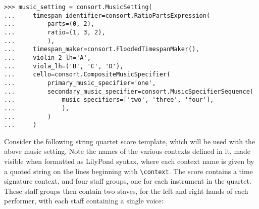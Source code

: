 \begin{abjadbookoutput}
\begin{singlespacing}
\vspace{-0.5\baselineskip}
\begin{lstlisting}
>>> music_setting = consort.MusicSetting(
...     timespan_identifier=consort.RatioPartsExpression(
...         parts=(0, 2),
...         ratio=(1, 3, 2),
...         ),
...     timespan_maker=consort.FloodedTimespanMaker(),
...     violin_2_lh='A',
...     viola_lh=('B', 'C', 'D'),
...     cello=consort.CompositeMusicSpecifier(
...         primary_music_specifier='one',
...         secondary_music_specifier=consort.MusicSpecifierSequence(
...             music_specifiers=['two', 'three', 'four'],
...             ),
...         )
...     )
\end{lstlisting}
\end{singlespacing}
\end{abjadbookoutput}

\noindent Consider the following string quartet score template, which will be
used with the above music setting. Note the names of the various contexts
defined in it, made visible when formatted as LilyPond syntax, where each
context name is given by a quoted string on the lines beginning with
\texttt{\textbackslash{}context}. The score contains a time signature context,
and four staff groups, one for each instrument in the quartet. These staff
groups then contain two staves, for the left and right hands of each
performer, with each staff containing a single voice:

\begin{comment}
<abjad>
score_template = consort.StringQuartetScoreTemplate()
score = score_template()
print(format(score))
</abjad>
\end{comment}

